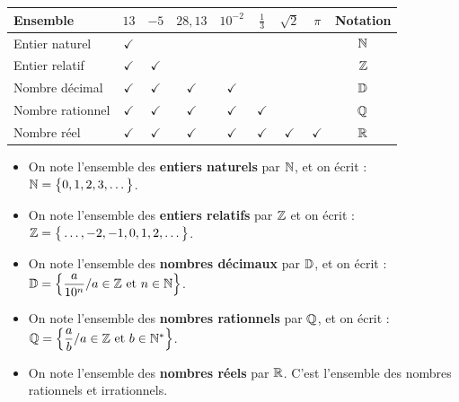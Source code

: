 \documentclass[10pt, a4paper]{article}
\begin{document}
\begin{Solution}[ACTIVITÉ][1]
\renewcommand{\arraystretch}{1.5}
\begin{center}
\begin{tabular}{|l|c|c|c|c|c|c|c|c|}
\hline
\textbf{\textcolor{PrimaryColor}{Ensemble}}
  & $13$
  & $-5$
  & $28{,}13$
  & $10^{-2}$
  & $\frac{1}{3}$
  & $\sqrt{2}$
  & $\pi$
  & \textbf{\textcolor{PrimaryColor}{Notation}} \\
\hline
Entier naturel   & $\checkmark$ &              &              &              &              &              &              & $\mathbb{N}$ \\
\hline
Entier relatif   & $\checkmark$ & $\checkmark$ &              &              &              &              &              & $\mathbb{Z}$ \\
\hline
Nombre décimal   & $\checkmark$ & $\checkmark$ & $\checkmark$ & $\checkmark$ &              &              &              & $\mathbb{D}$ \\
\hline
Nombre rationnel & $\checkmark$ & $\checkmark$ & $\checkmark$ & $\checkmark$ & $\checkmark$ &              &              & $\mathbb{Q}$ \\
\hline
Nombre réel      & $\checkmark$ & $\checkmark$ & $\checkmark$ & $\checkmark$ & $\checkmark$ & $\checkmark$ & $\checkmark$ & $\mathbb{R}$ \\
\hline
\end{tabular}
\end{center}
\renewcommand{\arraystretch}{1}
\end{Solution}


\begin{Definition}[]
\begin{itemize}
    \item On note l'ensemble des \textbf{entiers naturels} par $\mathbb{N}$, et on écrit : 
    $\mathbb{N} = \big\{0, 1, 2, 3, \dots\big\}$.
    \item On note l'ensemble des \textbf{entiers relatifs} par $\mathbb{Z}$ et on écrit :
    $\mathbb{Z} = \big\{\dots, -2, -1, 0, 1, 2, \dots\big\}$.
    \item On note l'ensemble des \textbf{nombres décimaux} par $\mathbb{D}$, et on écrit : 
    $\mathbb{D} = \left\{ \dfrac{a}{10^n} / a \in \mathbb{Z} \text{ et } n \in \mathbb{N} \right\}$.
    \item On note l'ensemble des \textbf{nombres rationnels} par $\mathbb{Q}$, et on écrit : 
    $\mathbb{Q} = \left\{ \dfrac{a}{b} / a \in \mathbb{Z} \text{ et } b \in \mathbb{N}^* \right\}$.
    \item On note l'ensemble des \textbf{nombres réels} par $\mathbb{R}$. C'est l'ensemble des nombres rationnels et irrationnels.
\end{itemize}
\end{Definition}
\end{document}
